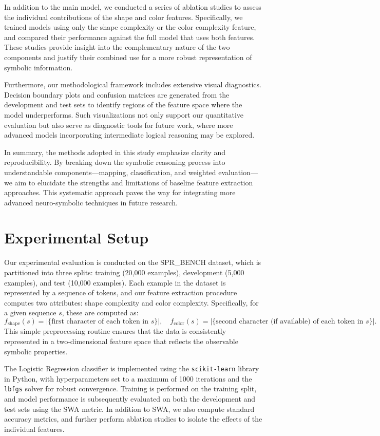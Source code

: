 \documentclass{article}
\begin{document}
In addition to the main model, we conducted a series of ablation studies to assess the individual contributions of the shape and color features. Specifically, we trained models using only the shape complexity or the color complexity feature, and compared their performance against the full model that uses both features. These studies provide insight into the complementary nature of the two components and justify their combined use for a more robust representation of symbolic information.

Furthermore, our methodological framework includes extensive visual diagnostics. Decision boundary plots and confusion matrices are generated from the development and test sets to identify regions of the feature space where the model underperforms. Such visualizations not only support our quantitative evaluation but also serve as diagnostic tools for future work, where more advanced models incorporating intermediate logical reasoning may be explored.

In summary, the methods adopted in this study emphasize clarity and reproducibility. By breaking down the symbolic reasoning process into understandable components—mapping, classification, and weighted evaluation—we aim to elucidate the strengths and limitations of baseline feature extraction approaches. This systematic approach paves the way for integrating more advanced neuro-symbolic techniques in future research.

\section{Experimental Setup}
Our experimental evaluation is conducted on the SPR\_BENCH dataset, which is partitioned into three splits: training (20,000 examples), development (5,000 examples), and test (10,000 examples). Each example in the dataset is represented by a sequence of tokens, and our feature extraction procedure computes two attributes: shape complexity and color complexity. Specifically, for a given sequence \( s \), these are computed as:
\[
f_{\text{shape}}(s)=\left|\{ \text{first character of each token in } s\}\right|,\quad f_{\text{color}}(s)=\left|\{ \text{second character (if available) of each token in } s\}\right|.
\]
This simple preprocessing routine ensures that the data is consistently represented in a two-dimensional feature space that reflects the observable symbolic properties.

The Logistic Regression classifier is implemented using the \texttt{scikit-learn} library in Python, with hyperparameters set to a maximum of 1000 iterations and the \texttt{lbfgs} solver for robust convergence. Training is performed on the training split, and model performance is subsequently evaluated on both the development and test sets using the SWA metric. In addition to SWA, we also compute standard accuracy metrics, and further perform ablation studies to isolate the effects of the individual features.
\end{document}
